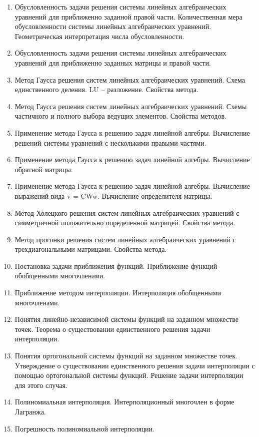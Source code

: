\documentclass[14pt]{extarticle}
\begin{document}
\begin{enumerate}
    \item Обусловленность задачи решения системы линейных алгебраических уравнений для приближенно заданной правой части. Количественная мера обусловленности системы линейных алгебраических уравнений. Геометрическая интерпретация числа обусловленности. 
    \item Обусловленность задачи решения системы линейных алгебраических уравнений для приближенно заданных матрицы и правой части. 
    \item Метод Гаусса решения систем линейных алгебраических уравнений. Схема единственного деления. LU – разложение. Свойства метода. 
    \item Метод Гаусса решения систем линейных алгебраических уравнений. Схемы частичного и полного выбора ведущих элементов. Свойства методов. 
    \item Применение метода Гаусса к решению задач линейной алгебры. Вычисление  решений системы уравнений с несколькими правыми частями. 
    \item Применение метода Гаусса к решению задач линейной алгебры. Вычисление обратной матрицы. 
    \item Применение метода Гаусса к решению задач линейной алгебры. Вычисление выражений вида v = CWw. Вычисление определителя матрицы. 
    \item Метод Холецкого решения систем линейных алгебраических уравнений с симметричной положительно определенной матрицей. Свойства метода. 
    \item Метод прогонки решения систем линейных алгебраических уравнений с трехдиагональными матрицами. Свойства метода. 
    \item Постановка задачи приближения функций. Приближение функций обобщенными многочленами. 
    \item Приближение методом интерполяции. Интерполяция обобщенными многочленами. 
    \item Понятия линейно-независимой системы функций на заданном множестве точек. Теорема о существовании единственного решения задачи интерполяции. 
    \item Понятия ортогональной системы функций на заданном множестве точек. Утверждение о существовании единственного решения задачи интерполяции с помощью ортогональной системы функций. Решение задачи интерполяции для этого случая. 
    \item Полиномиальная интерполяция. Интерполяционный многочлен в форме Лагранжа. 
    \item Погрешность полиномиальной интерполяции. 

\end{enumerate}
\end{document}
